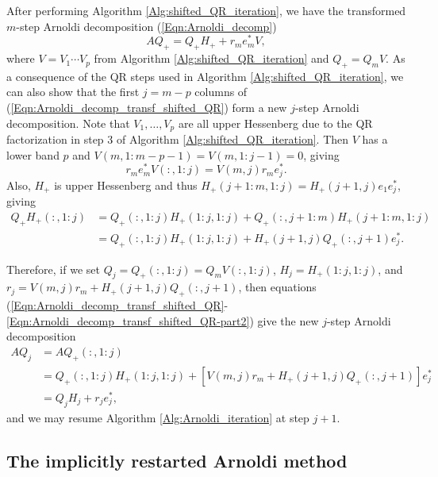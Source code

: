 After performing Algorithm \ref{Alg:shifted_QR_iteration}, we have the transformed $m$-step Arnoldi decomposition (\ref{Eqn:Arnoldi_decomp})
\begin{equation}			\label{Eqn:Arnoldi_decomp_transf_shifted_QR}
AQ_+ = Q_+H_+ + r_me_m^*V,
\end{equation}
where $V = V_1 \cdots V_p$ from Algorithm \ref{Alg:shifted_QR_iteration} and $Q_+ = Q_mV$.  As a consequence of the QR steps used in Algorithm \ref{Alg:shifted_QR_iteration}, we can also show that the first $j = m-p$ columns of (\ref{Eqn:Arnoldi_decomp_transf_shifted_QR}) form a new $j$-step Arnoldi decomposition.  Note that $V_1, \ldots, V_p$ are all upper Hessenberg due to the QR factorization in step 3 of Algorithm \ref{Alg:shifted_QR_iteration}.  Then $V$ has a lower band $p$ and $V(m, 1:m-p-1) = V(m, 1:j-1) = 0$, giving
\begin{equation} 			\label{Eqn:Arnoldi_decomp_transf_shifted_QR-part1}
r_me_m^*V(:, 1:j) = V(m,j)r_me_j^*.
\end{equation}
Also, $H_+$ is upper Hessenberg and thus $H_+(j+1:m, 1:j) = H_+(j+1,j)e_1e_j^*$, giving
\begin{equation} 		\label{Eqn:Arnoldi_decomp_transf_shifted_QR-part2}
\begin{split}
Q_+H_+(:, 1:j) 
	&	=  Q_+(:, 1:j) H_+(1:j, 1:j) + Q_+(:, j+1:m)H_+(j+1:m, 1:j) \\
	&	=	Q_+(:, 1:j) H_+(1:j, 1:j) +  H_+(j+1,j)Q_+(:,j+1)e_j^*.
\end{split}
\end{equation}

Therefore, if we set $Q_j = Q_+(:, 1:j) = Q_mV(:, 1:j)$, $H_j = H_+(1:j, 1:j)$, and $r_j = V(m,j)r_m + H_+(j+1,j)Q_+(:,j+1)$, then equations (\ref{Eqn:Arnoldi_decomp_transf_shifted_QR}-\ref{Eqn:Arnoldi_decomp_transf_shifted_QR-part2}) give the new $j$-step Arnoldi decomposition
\begin{equation}		\label{Eqn:Arnoldi_decomp_j-step_update}
\begin{split}
AQ_j  
	&	= AQ_+(:, 1:j) 	\\
	& = Q_+(:, 1:j)H_+(1:j, 1:j) + \left[V(m,j)r_m + H_+(j+1,j)Q_+(:,j+1) \right] e_j^*		\\
	& = Q_jH_j + r_je_j^*,
\end{split}
\end{equation}
and we may resume Algorithm \ref{Alg:Arnoldi_iteration} at step $j+1$.




\subsection{The implicitly restarted Arnoldi method} 			\label{Subsubsec:evol_mats-IRAM}


